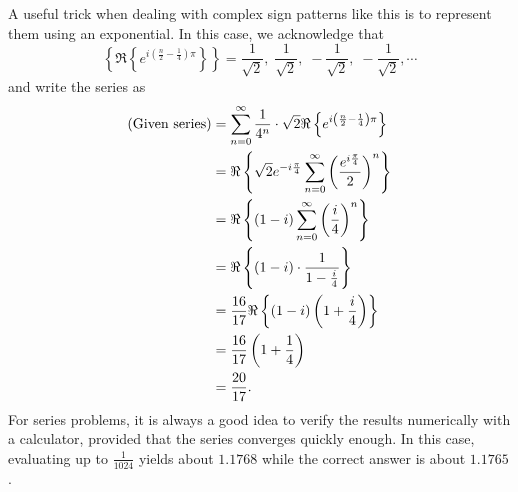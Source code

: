 \item

A useful trick when dealing with complex sign patterns like this is to represent them using an exponential.
In this case, we acknowledge that
\[
	\left\{ \Re \left\{ e^{i\left( \frac{n}{2} - \frac{1}{4} \right) \pi} \right\} \right\}
	= \frac{1}{\sqrt{2}},\; \frac{1}{\sqrt{2}},\; -\frac{1}{\sqrt{2}},\; -\frac{1}{\sqrt{2}}, \cdots
\]
and write the series as
\begin{align*}
	(\text{Given series})
	 & = \sum_{n=0}^\infty \frac{1}{4^n} \cdot \sqrt{2} \Re \left\{ e^{i\left( \frac{n}{2} - \frac{1}{4} \right) \pi} \right\} \\
	 & = \Re \left\{ \sqrt{2} e^{-i\frac{\pi}{4}} \sum_{n=0}^\infty {\left( \frac{e^{i\frac{\pi}{4}}}{2} \right)}^n \right\}         \\
	 & = \Re \left\{ (1 - i) \sum_{n=0}^\infty {\left( \frac{i}{4} \right)}^n \right\}                                         \\
	 & = \Re \left\{ (1 - i) \cdot \frac{1}{1 - \frac{i}{4}} \right\}                                                          \\
	 & = \frac{16}{17} \Re \left\{ (1 - i) \left( 1 + \frac{i}{4} \right) \right\}                                             \\
	 & = \frac{16}{17} \left( 1 + \frac{1}{4} \right)                                                                          \\
	 & = \frac{20}{17}.
\end{align*}
For series problems, it is always a good idea to verify the results numerically with a calculator, provided that the series converges quickly enough.
In this case, evaluating up to $\frac{1}{1024}$ yields about $1.1768$ while the correct answer is about $1.1765$.
